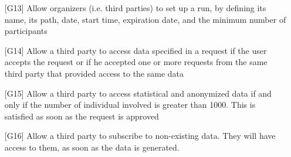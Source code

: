 \begin{enumerate}
\item[{[G13]}] Allow organizers (i.e. third parties) to set up a run, by defining its name, its path, date, start time, expiration date, and the minimum number of participants
\item[{[G14]}] Allow a third party to access data specified in a request if the user accepts the request or if he accepted one or more requests from the same third party that provided access to the same data 
\item[{[G15]}] Allow a third party to access statistical and anonymized data if and only if the number of individual involved is greater than 1000. This is satisfied as soon as the request is approved  
\item[{[G16]}] Allow a third party to subscribe to non-existing data. They will have access to them, as soon as the data is generated. 
\end{enumerate}